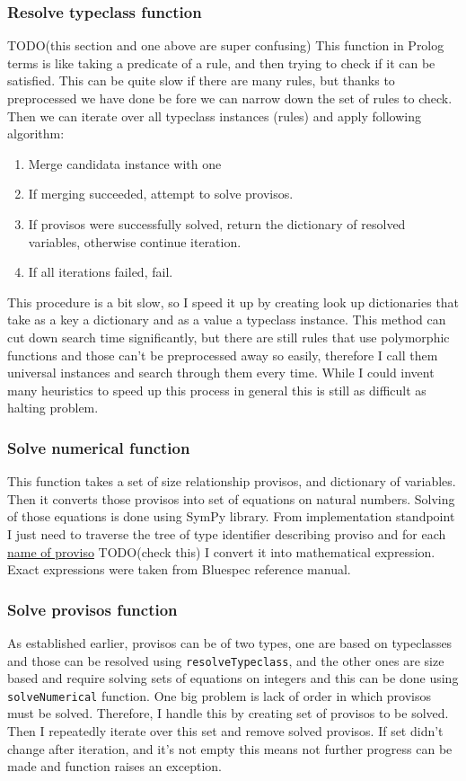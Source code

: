 \documentclass[12pt]{report}
\begin{document}
\subsubsection{Resolve typeclass function}
TODO(this section and one above are super confusing)
This function in Prolog terms is like taking a predicate of a rule, and then trying to check if it can be satisfied. This can be quite slow if there are many rules, but thanks to preprocessed we have done be fore we can narrow down the set of rules to check.
Then we can iterate over all typeclass instances (rules) and apply following algorithm:
\begin{enumerate} 
    \item Merge candidata instance with one 
    \item If merging succeeded, attempt to solve provisos.
    \item If provisos were successfully solved, return the dictionary of resolved variables, otherwise continue iteration.
    \item If all iterations failed, fail.
\end{enumerate}
This procedure is a bit slow, so I speed it up by creating look up dictionaries that take as a key a dictionary and as a value a typeclass instance. This method can cut down search time significantly, but there are still rules that use polymorphic functions and those can't be preprocessed away so easily, therefore I call them universal instances and search through them every time. While I could invent many heuristics to speed up this process in general this is still as difficult as halting problem.

\subsubsection{Solve numerical function}
This function takes a set of size relationship provisos, and dictionary of variables. Then it converts those provisos into set of equations on natural numbers. Solving of those equations is done using SymPy library.
From implementation standpoint I just need to traverse the tree of type identifier describing proviso and for each \hyperref[sec:Provisos]{name of proviso} TODO(check this) I convert it into mathematical expression. Exact expressions were taken from Bluespec reference manual.

\subsubsection{Solve provisos function}
As established earlier, provisos can be of two types, one are based on typeclasses and those can be resolved using \verb!resolveTypeclass!, and the other ones are size based and require solving sets of equations on integers and this can be done using \verb!solveNumerical! function.
One big problem is lack of order in which provisos must be solved. Therefore, I handle this by creating set of provisos to be solved. Then I repeatedly iterate over this set and remove solved provisos. If set didn't change after iteration, and it's not empty this means not further progress can be made and function raises an exception.
\end{document}
